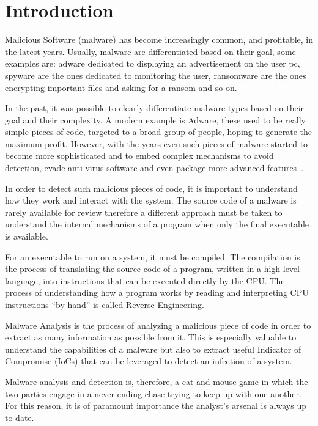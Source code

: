 \chapter{Introduction}

Malicious Software (malware) has become increasingly common, and profitable, in the latest years. Usually, malware are differentiated based on their goal, some examples are: adware dedicated to displaying an advertisement on the user pc, spyware are the ones dedicated to monitoring the user, ransomware are the ones encrypting important files and asking for a ransom and so on. 

In the past, it was possible to clearly differentiate malware types based on their goal and their complexity. A modern example is Adware, these used to be really simple pieces of code, targeted to a broad group of people, hoping to generate the maximum profit. However, with the years even such pieces of malware started to become more sophisticated and to embed complex mechanisms to avoid detection, evade anti-virus software and even package more advanced features~\cite{bitdef}.

In order to detect such malicious pieces of code, it is important to understand how they work and interact with the system. The source code of a malware is rarely available for review therefore a different approach must be taken to understand the internal mechanisms of a program when only the final executable is available. 

For an executable to run on a system, it must be compiled. The compilation is the process of translating the source code of a program, written in a high-level language, into instructions that can be executed directly by the CPU. The process of understanding how a program works by reading and interpreting CPU instructions ``by hand'' is called Reverse Engineering.

Malware Analysis is the process of analyzing a malicious piece of code in order to extract as many information as possible from it. This is especially valuable to understand the capabilities of a malware but also to extract useful Indicator of Compromise (IoCs) that can be leveraged to detect an infection of a system. 

Malware analysis and detection is, therefore, a cat and mouse game in which the two parties engage in a never-ending chase trying to keep up with one another. For this reason, it is of paramount importance the analyst's arsenal is always up to date.

